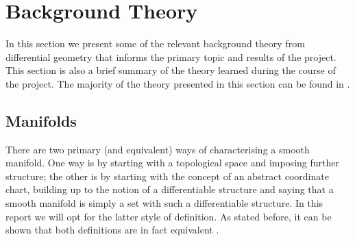 \documentclass[12pt,a4paper]{article}
\numberwithin{equation}{section}
\theoremstyle{definition}
\theoremstyle{remark}
\begin{document}
\section{Background Theory}
In this section we present some of the relevant background theory from differential geometry that informs the primary topic and results of the project. This section is also a brief summary of the theory learned during the course of the project. The majority of the theory presented in this section can be found in \cite{andrews,burger2016riemannian,hitchin_2012,MR2954043}.
\subsection{Manifolds}
There are two primary (and equivalent) ways of characterising a smooth manifold. One way is by starting with a topological space and imposing further structure; the other is by starting with the concept of an abstract coordinate chart, building up to the notion of a differentiable structure and saying that a smooth manifold is simply a set with such a differentiable structure. In this report we will opt for the latter style of definition. As stated before, it can be shown that both definitions are in fact equivalent \cite{MR2954043,MR2766102}.\\
\end{document}
